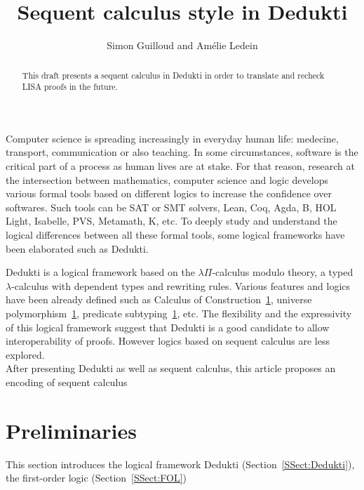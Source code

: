 \documentclass{article}
\title{Sequent calculus style in Dedukti}
\author{Simon Guilloud and Amélie Ledein}
\date{}
\begin{document}
	\maketitle

	\begin{abstract}
		This draft presents a sequent calculus in Dedukti in order to translate and recheck LISA proofs in the future.
	\end{abstract}

	Computer science is spreading increasingly in everyday human life: medecine, transport, communication or also teaching. In some circumstances, software is the critical part of a process as human lives are at stake.
	For that reason, research at the intersection between mathematics, computer science and logic develops various formal tools
	based on different logics to increase the confidence over softwares.
	Such tools can be SAT or SMT solvers, 
	Lean, Coq, Agda, B, HOL Light, Isabelle, PVS, Metamath, K, etc.
	To deeply study and understand the logical differences between all these formal tools, some logical frameworks have been elaborated such as Dedukti.

	Dedukti is a logical framework based on the $\lambda\Pi$-calculus modulo theory, a typed $\lambda$-calculus with dependent types and rewriting rules.
	Various features and logics have been already defined such as Calculus of Construction~\ref{}, universe polymorphism~\ref{}, predicate subtyping~\ref{}, etc.
	The flexibility and the expressivity of this logical framework suggest that Dedukti is a good candidate to allow interoperability of proofs.
	However logics based on sequent calculus are less explored. \\



	After presenting Dedukti as well as sequent calculus, this article proposes an encoding of sequent calculus 

\newpage

	\section{Preliminaries}

	This section introduces the logical framework Dedukti (Section~\ref{SSect:Dedukti}), the first-order logic (Section~\ref{SSect:FOL})
\end{document}
